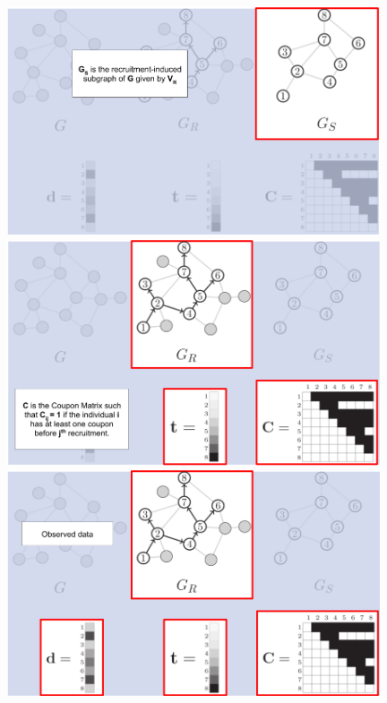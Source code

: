 \documentclass{beamer}
\begin{document}
\begin{frame}
\begin{figure}
\begin{overprint}
    \includegraphics[width=0.98\textwidth]{../../images/graphical-model-example-4.png}
    \includegraphics[width=0.98\textwidth]{../../images/graphical-model-example-5.png}
    \includegraphics[width=0.98\textwidth]{../../images/graphical-model-example-6.png}
    \end{overprint}
  \end{figure}  
  
\end{frame}
\end{document}

